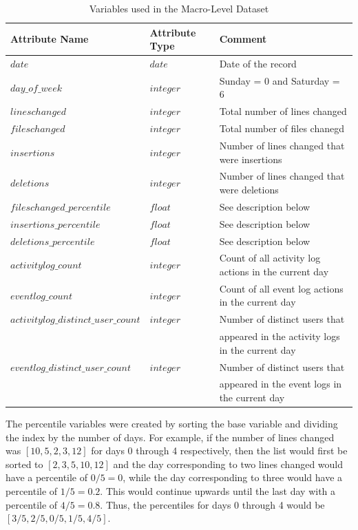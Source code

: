 \documentclass[12pt]{article}
\begin{document}
\begin{table}[h!]
\footnotesize
\centering
\caption{Variables used in the Macro-Level Dataset}
\begin{tabular}{l | l | l}
Attribute Name & Attribute Type & Comment \\
\hline \hline
$date$ & $date$ & Date of the record \\  
$day\_of\_week$ & $integer$ & Sunday = 0 and Saturday = 6 \\
$lineschanged$ & $integer$ & Total number of lines changed \\
$fileschanged$ & $integer$ & Total number of files chanegd \\
$insertions$ & $integer$ & Number of lines changed that were insertions \\
$deletions$ & $integer$ & Number of lines changed that were deletions \\
$fileschanged\_percentile$ & $float$ & See description below \\
$insertions\_percentile$ & $float$ & See description below \\
$deletions\_percentile$ & $float$ & See description below \\
$activitylog\_count$ & $integer$ & Count of all activity log actions in the current day \\
$eventlog\_count$ & $integer$ & Count of all event log actions in the current day \\
$activitylog\_distinct\_user\_count$ & $integer$ & Number of distinct users that \\
 & & appeared in the activity logs in the current day \\
$eventlog\_distinct\_user\_count$ & $integer$ & Number of distinct users that \\
 & &appeared in the event logs in the current day \\
\end{tabular}
\end{table}

The percentile variables were created by sorting the base variable and dividing the index by the number of days. For example, if the number of lines changed was $[10,5,2,3,12]$ for days 0 through 4 respectively, then the list would first be sorted to $[2,3,5,10,12]$ and the day corresponding to two lines changed would have a percentile of $0/5 = 0$, while the day corresponding to three would have a percentile of $1/5 = 0.2$. This would continue upwards until the last day with a percentile of $4/5 = 0.8$. Thus, the percentiles for days 0 through 4 would be $[3/5, 2/5, 0/5, 1/5, 4/5]$. 
\end{document}
